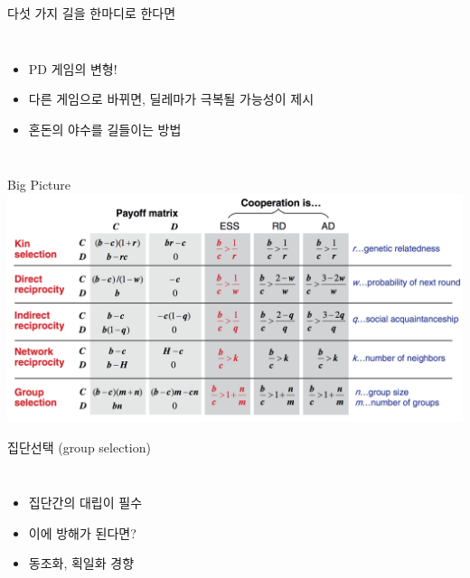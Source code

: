 \documentclass[final]{beamer}
\begin{document}
\begin{frame}[t]{다섯 가지 길을 한마디로 한다면}
	\begin{columns}[c]
		\column{12em}
		\begin{itemize}
			\item PD 게임의 변형! 
			\item 다른 게임으로 바뀌면, 딜레마가 극복될 가능성이 제시
			\item 혼돈의 야수를 길들이는 방법
		\end{itemize}
		\column{18em}
	\end{columns}
\end{frame}

\begin{frame}[t]{Big Picture}
	\includegraphics[width=\textwidth]{fiverule.png}
\end{frame}

\begin{frame}[t]{집단선택 (group selection)}
	\begin{columns}[c]
		\column{12em}
		\begin{itemize}
			\item 집단간의 대립이 필수
			\item 이에 방해가 된다면?
			\item 동조화, 획일화 경향
		\end{itemize}
		\column{18em}
	\end{columns}
\end{frame}
\end{document}
